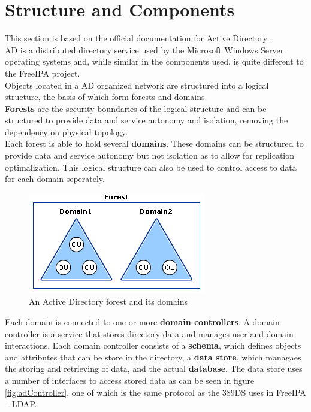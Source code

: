 \section{Structure and Components}
This section is based on the official documentation for Active Directory \cite{ADoverview}.\\
AD is a distributed directory service used by the Microsoft Windows Server operating systems and, while similar in the components used, is quite different to the FreeIPA project.\\
Objects located in a AD organized network are structured into a logical structure, the basis of which form forests and domains. \\
\textbf{Forests} are the security boundaries of the logical structure and can be structured to provide data and service autonomy and isolation, removing the dependency on physical topology. \\
Each forest is able to hold several \textbf{domains}. These domains can be structured to provide data and service autonomy but not isolation as to allow for replication optimalization.
This logical structure can also be used to control access to data for each domain seperately.

\begin{figure}[!ht]
    \centering
        \includegraphics[scale=0.6]{fig/AD-forest}
    \caption{An Active Directory forest and its domains \cite{ADoverview}}
    \label{fig:adForest}
\end{figure}

Each domain is connected to one or more \textbf{domain controllers}. A domain controller is a service that stores directory data and manages user and domain interactions.
Each domain controller consists of a \textbf{schema}, which defines objects and attributes that can be store in the directory, a \textbf{data store}, which managaes the storing and retrieving of data, and the actual \textbf{database}.
The data store uses a number of interfaces to access stored data as can be seen in figure \ref{fig:adController}, one of which is the same protocol as the 389DS uses in FreeIPA -- LDAP.

